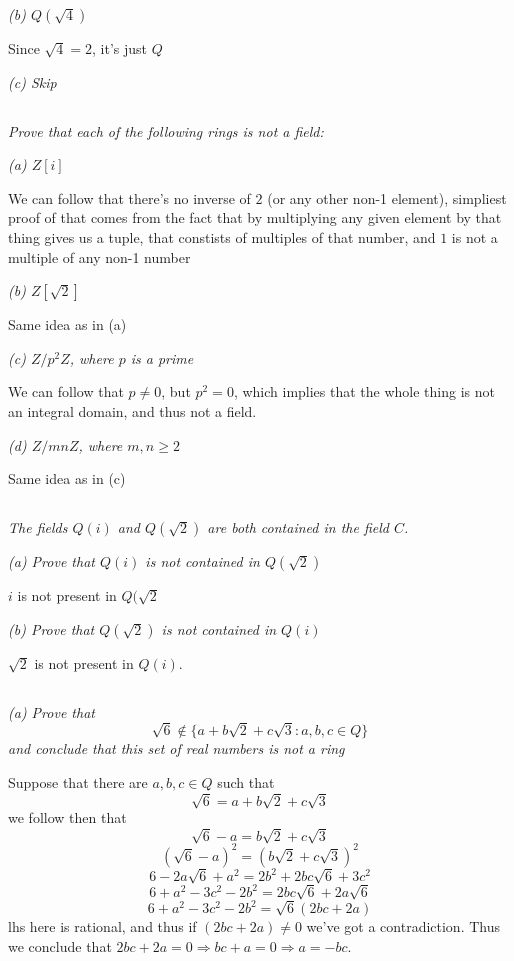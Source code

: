 \documentclass[11pt,oneside,titlepage]{book}
\DeclareMathOperator \ra {\Rightarrow}
\newcommand{\set}[1]{\{ #1 \}}
\begin{document}
\textit{(b) $Q(\sqrt{4})$}

Since $\sqrt{4} = 2$, it's just $Q$

\textit{(c) Skip}

\subsection{}

\textit{Prove that each of the following rings is not a field:}

\textit{(a) $Z[i]$}

We can follow that there's no inverse of $2$ (or any other non-1
element), simpliest proof of that comes from the fact that by
multiplying any given element by that thing gives us a tuple, that
constists of multiples of that number, and $1$ is not a multiple of
any non-1 number

\textit{(b) $Z[\sqrt{2}]$}

Same idea as in (a)

\textit{(c) $Z/p^2Z$, where $p$ is a prime}

We can follow that $p \neq 0$, but $p^2 = 0$, which implies that the
whole thing is not an integral domain, and thus not a field.

\textit{(d) $Z/mnZ$, where $m, n \geq 2$}

Same idea as in (c)

\subsection{}

\textit{The fields $Q(i)$ and $Q(\sqrt{2})$ are both contained in the
field $C$.}

\textit{(a) Prove that $Q(i)$ is not contained in $Q(\sqrt{2})$}

$i$ is not present in $Q(\sqrt{2}$

\textit{(b) Prove that $Q(\sqrt{2})$ is not contained in $Q(i)$}

$\sqrt{2}$ is not present in $Q(i)$.

\subsection{}

\textit{(a) Prove that
  $$\sqrt{6} \notin \set{a + b\sqrt{2} + c\sqrt{3}: a, b, c \in Q}$$
  and conclude that this set of real numbers is not a ring }

Suppose that there are $a, b, c \in Q$ such that
$$\sqrt{6} = a + b\sqrt{2} + c\sqrt{3}$$
we follow then that
$$\sqrt{6} - a = b\sqrt{2} + c\sqrt{3}$$
$$(\sqrt{6} - a)^2 = (b\sqrt{2} + c\sqrt{3})^2$$
$$6 - 2a\sqrt{6} + a^2 = 2b^2 + 2bc\sqrt{6} + 3c^2$$
$$6  + a^2 - 3c^2 - 2b^2 = 2bc\sqrt{6} + 2a\sqrt{6} $$
$$6  + a^2 - 3c^2 - 2b^2 = \sqrt{6}(2bc + 2a) $$
lhs here is rational, and thus if $(2bc + 2a) \neq 0$ we've got a
contradiction. Thus we conclude that $2bc + 2a = 0 \ra bc + a = 0 \ra
a = -bc$.
\end{document}
